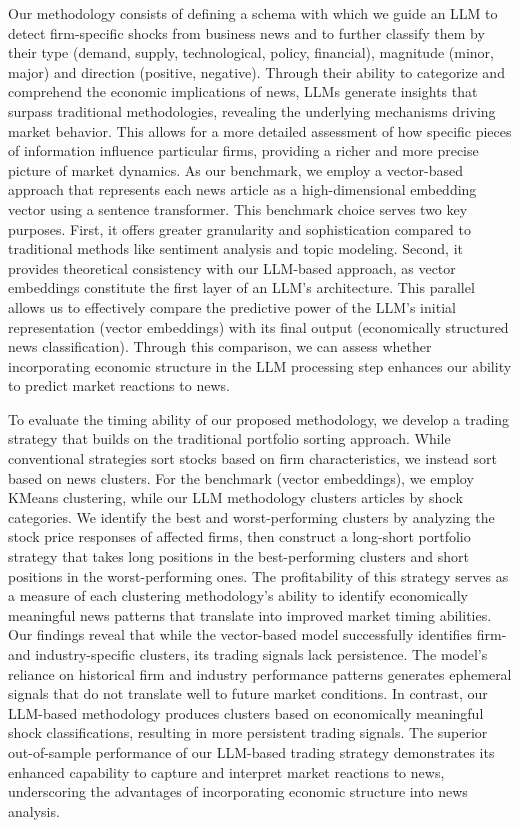 \mx
Our methodology consists of defining a schema with which we guide an LLM to detect firm-specific shocks from business news and to further classify them by their type (demand, supply, technological, policy, financial), magnitude (minor, major) and direction (positive, negative). Through their ability to categorize and comprehend the economic implications of news, LLMs generate insights that surpass traditional methodologies, revealing the underlying mechanisms driving market behavior. This allows for a more detailed assessment of how specific pieces of information influence particular firms, providing a richer and more precise picture of market dynamics.
%
As our benchmark, we employ a vector-based approach that represents each news article as a high-dimensional embedding vector using a sentence transformer. This benchmark choice serves two key purposes. First, it offers greater granularity and sophistication compared to traditional methods like sentiment analysis and topic modeling. Second, it provides theoretical consistency with our LLM-based approach, as vector embeddings constitute the first layer of an LLM's architecture. This parallel allows us to effectively compare the predictive power of the LLM's initial representation (vector embeddings) with its final output (economically structured news classification). Through this comparison, we can assess whether incorporating economic structure in the LLM processing step enhances our ability to predict market reactions to news.

\mx 
To evaluate the timing ability of our proposed methodology, we develop a trading strategy that builds on the traditional portfolio sorting approach. While conventional strategies sort stocks based on firm characteristics, we instead sort based on news clusters. For the benchmark (vector embeddings), we employ KMeans clustering, while our LLM methodology clusters articles by shock categories. We identify the best and worst-performing clusters by analyzing the stock price responses of affected firms, then construct a long-short portfolio strategy that takes long positions in the best-performing clusters and short positions in the worst-performing ones. The profitability of this strategy serves as a measure of each clustering methodology's ability to identify economically meaningful news patterns that translate into improved market timing abilities.
%
Our findings reveal that while the vector-based model successfully identifies firm- and industry-specific clusters, its trading signals lack persistence. The model's reliance on historical firm and industry performance patterns generates ephemeral signals that do not translate well to future market conditions. In contrast, our LLM-based methodology produces clusters based on economically meaningful shock classifications, resulting in more persistent trading signals. The superior out-of-sample performance of our LLM-based trading strategy demonstrates its enhanced capability to capture and interpret market reactions to news, underscoring the advantages of incorporating economic structure into news analysis.

